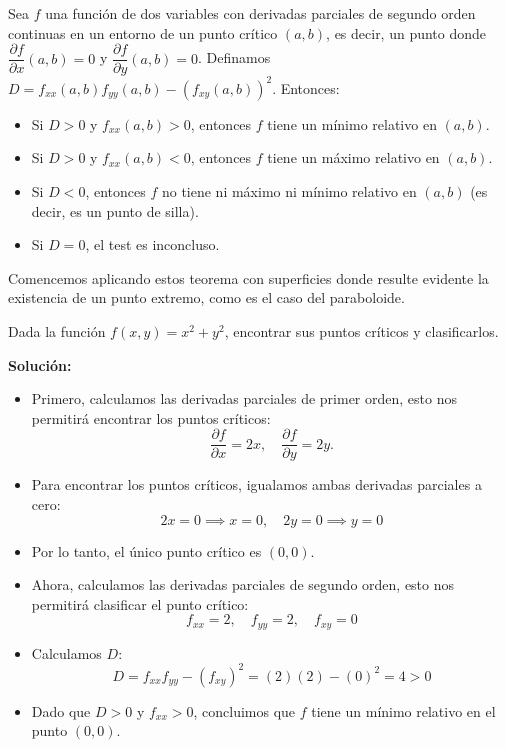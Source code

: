 \begin{teorema}
    Sea $f$ una función de dos variables con derivadas parciales de segundo orden continuas en un entorno de un punto crítico $(a,b)$, es decir, un punto donde $\dfrac{\partial f}{\partial x}(a,b)=0$ y $\dfrac{\partial f}{\partial y}(a,b)=0$. Definamos $D=f_{xx}(a,b)f_{yy}(a,b)-\left(f_{xy}(a,b)\right)^2$. Entonces:
    \begin{itemize}
        \item Si $D>0$ y $f_{xx}(a,b)>0$, entonces $f$ tiene un mínimo relativo en $(a,b)$.
        \item Si $D>0$ y $f_{xx}(a,b)<0$, entonces $f$ tiene un máximo relativo en $(a,b)$.
        \item Si $D<0$, entonces $f$ no tiene ni máximo ni mínimo relativo en $(a,b)$ (es decir, es un punto de silla).
        \item Si $D=0$, el test es inconcluso.
    \end{itemize}
\end{teorema}

\newpage

Comencemos aplicando estos teorema con superficies donde resulte evidente la existencia de un punto extremo, como es el caso del paraboloide.

\begin{ejemplo}
    Dada la función $f(x,y)=x^2+y^2$, encontrar sus puntos críticos y clasificarlos.
\end{ejemplo}
\textbf{Solución:}
\begin{itemize}
    \item Primero, calculamos las derivadas parciales de primer orden, esto nos permitirá encontrar los puntos críticos:
    \[
\frac{\partial f}{\partial x} = 2x, \quad \frac{\partial f}{\partial y} = 2y.
    \]
    \item Para encontrar los puntos críticos, igualamos ambas derivadas parciales a cero:
    \[
2x = 0 \implies x = 0, \quad 2y = 0 \implies y = 0
    \]
    \item Por lo tanto, el único punto crítico es $(0,0)$.
    \item Ahora, calculamos las derivadas parciales de segundo orden, esto nos permitirá clasificar el punto crítico:
    \[
    f_{xx} = 2, \quad f_{yy} = 2, \quad f_{xy} = 0
    \]
    \item Calculamos $D$:
    \[
    D = f_{xx}f_{yy} - (f_{xy})^2 = (2)(2) - (0)^2 = 4 > 0
    \]
    \item Dado que $D > 0$ y $f_{xx} > 0$, concluimos que $f$ tiene un mínimo relativo en el punto $(0,0)$.
\end{itemize}

